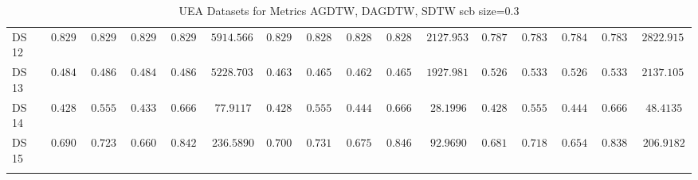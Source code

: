{\begin{longtable}{|l|ccccc|ccccc|ccccc|}
		DS 12 & $0.8298$ & $0.8291$ & $0.8294$ & $0.8291$ & $5914.5661$ & $0.8298$ & $0.8281$ & $0.8287$ & $0.8281$ & $2127.9539$ & $0.7872$ & $0.7839$ & $0.7841$ & $0.7839$ & $2822.9156$ \\
		DS 13 & $0.4842$ & $0.4866$ & $0.4840$ & $0.4866$ & $5228.7036$ & $0.4632$ & $0.4653$ & $0.4629$ & $0.4653$ & $1927.9817$ & $0.5263$ & $\boldsymbol{0.5331}$ & $\boldsymbol{0.5261}$ & $\boldsymbol{0.5331}$ & $2137.1052$ \\
		DS 14 & $0.4286$ & $0.5556$ & $0.4333$ & $0.6667$ & $77.9117$ & $0.4286$ & $0.5556$ & $0.4444$ & $0.6667$ & $28.1996$ & $0.4286$ & $0.5556$ & $0.4444$ & $0.6667$ & $48.4135$ \\
		DS 15 & $0.6909$ & $0.7239$ & $0.6601$ & $0.8422$ & $236.5890$ & $\boldsymbol{0.7000}$ & $\boldsymbol{0.7317}$ & $\boldsymbol{0.6751}$ & $\boldsymbol{0.8467}$ & $92.9690$ & $0.6818$ & $0.7181$ & $0.6548$ & $0.8389$ & $206.9182$ \\
		\hline
		\caption{UEA Datasets for Metrics AGDTW, DAGDTW, SDTW \gls{scb} size=0.3}
		\label{tab:UEA_agdtw-dagdtw-sdtw_scb_size=0.3}
	\end{longtable}
}
